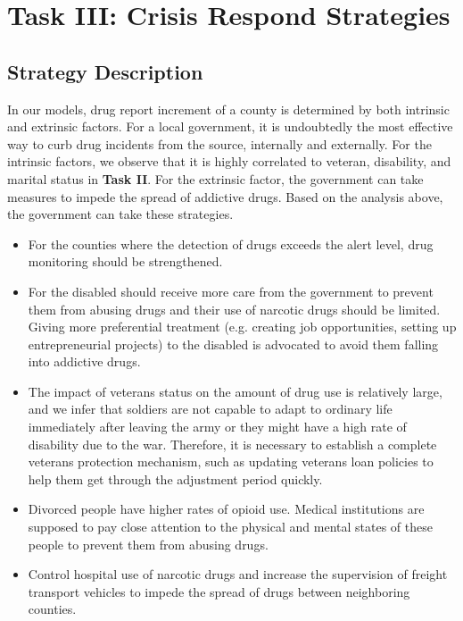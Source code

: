 \documentclass[a4paper]{article}
\begin{document}
\section{\textbf{Task III}: Crisis Respond Strategies}

\subsection{Strategy Description}
In our models, drug report increment of a county is determined by both intrinsic and extrinsic factors. For a local government, it is undoubtedly the most effective way to curb drug incidents from the source, internally and externally. For the intrinsic factors, we observe that it is highly correlated to veteran, disability, and marital status in \textbf{Task II}. For the extrinsic factor, the government can take measures to impede the spread of addictive drugs. Based on the analysis above, the government can take these strategies.

\begin{itemize}

    \item For the counties where the detection of drugs exceeds the alert level, drug monitoring should be strengthened. 
  

    \item For the disabled should receive more care from the government to prevent them from abusing drugs and their use of narcotic drugs should be limited. Giving more preferential treatment (e.g. creating job opportunities, setting up entrepreneurial projects) to the disabled is advocated to avoid them falling into addictive drugs. \cite{disable}
    
    \item The impact of veterans status on the amount of drug use is relatively large, and we infer that soldiers are not capable to adapt to ordinary life immediately after leaving the army or they might have a high rate of disability due to the war. Therefore, it is necessary to establish a complete veterans protection mechanism, such as updating veterans loan policies to help them get through the adjustment period quickly. \cite{Veterans}
    
    \item Divorced people have higher rates of opioid use. Medical institutions are supposed to pay close attention to the physical and mental states of these people to prevent them from abusing drugs.

    \item Control hospital use of narcotic drugs and increase the supervision of freight transport vehicles to impede the spread of drugs between neighboring counties.


\end{itemize}
\end{document}
